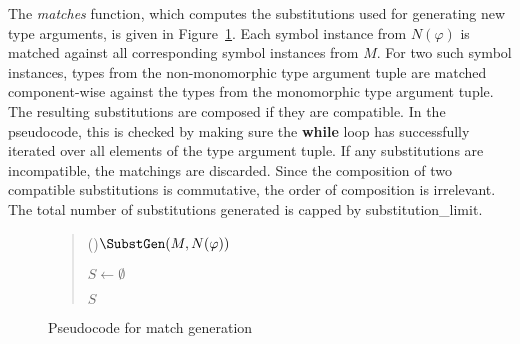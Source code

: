 \documentclass[]{ceurart}
\begin{document}
The \emph{matches} function, which computes the substitutions used for generating new type arguments, is given in Figure~\ref{subst_gen}. Each symbol instance from \(N(\varphi)\) is matched against all corresponding symbol instances from \(M\).
For two such symbol instances, types from the non-monomorphic type argument tuple are matched component-wise against the types from the monomorphic type argument tuple. The resulting substitutions are composed if they are compatible. In the pseudocode, this is checked by making sure the \textbf{while} loop has successfully iterated over all elements of the type argument tuple. If any substitutions are incompatible, the matchings are discarded. Since the composition of two compatible substitutions is commutative, the order of composition is irrelevant. The total number of substitutions generated is capped by \textcolor{ourblueviolet}{substitution\_limit}.

\begin{figure}
\begin{quote}
\begin{algorithm}[H]
\Fn(){\(\SubstGen(M, N(\varphi))\)}{

   \BlankLine

   \(S\leftarrow \emptyset\)\;

   \BlankLine


   \BlankLine

   \Return \(S\)\;

}
\end{algorithm}
\end{quote}
\caption{Pseudocode for match generation}
\label{subst_gen}
\end{figure}
\end{document}
